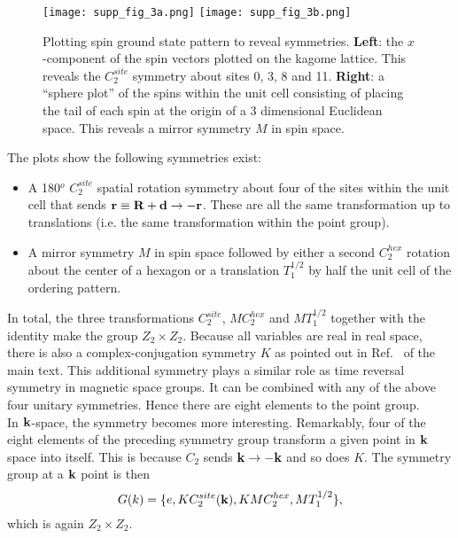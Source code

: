 \documentclass[a4paper,aps,prl,floatfix,showpacs,superscriptaddress,notitlepage]{revtex4-1}
\begin{document}
\begin{figure}
\centering
 \texttt{[image: supp\_fig\_3a.png]}
 \texttt{[image: supp\_fig\_3b.png]}
 \caption{Plotting spin ground state pattern to reveal symmetries. {\bf Left}: the $x$-component of the spin vectors plotted on the kagome lattice. This reveals the $C_2^{site}$ symmetry about sites 0, 3, 8 and 11. {\bf Right}: a ``sphere plot'' of the spins within the unit cell consisting of placing the tail of each spin at the origin of a 3 dimensional Euclidean space. This reveals a mirror symmetry $M$ in spin space.}
\label{figM1}
\end{figure}


The plots show the following symmetries exist:

\begin{itemize}
\setlength{\itemindent}{0.63cm}
\item A 180$^o$ $C_2^{site}$ spatial rotation symmetry about four of the sites within the unit cell that sends ${\bf r} \equiv {\bf R} + {\bf d} \to -{\bf r}$. These are all the same transformation up to translations (i.e. the same transformation within the point group).
\item A mirror symmetry $M$ in spin space followed by either a second $C_2^{hex}$ rotation about the center of a hexagon or a translation $T_1^{1/2}$ by half the unit cell of the ordering pattern.
\end{itemize}


In total, the three transformations $C_2^{site}$, $MC_{2}^{hex}$ and $MT_1^{1/2}$ together with the identity make the group $Z_2\times Z_2$. Because all variables are real in real space, there is also a complex-conjugation symmetry $K$ as pointed out in Ref.~\cite{kane2014topological} of the main text. This additional symmetry plays a similar role as time reversal symmetry in magnetic space groups. It can be combined with any of the above four unitary symmetries. Hence there are eight elements to the point group. \\


In ${\bf k}$-space, the symmetry becomes more interesting. Remarkably, four of the eight elements of the preceding symmetry group transform a given point in ${\bf k}$ space into itself. This is because $C_2$ sends ${\bf k} \to -{\bf k}$ and so does $K$. The symmetry group at a ${\bf k}$ point is then
\begin{equation}
G(k) = \{e,KC_2^{site}({\bf k}), KMC_2^{hex}, MT_1^{1/2}\}, \nonumber
\end{equation}
which is again $Z_2\times Z_2$. \\
\end{document}
